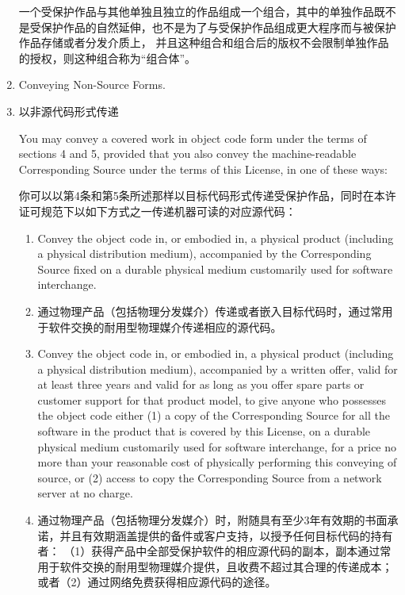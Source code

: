 \documentclass[11pt]{article}
\begin{document}
\begin{enumerate}
         一个受保护作品与其他单独且独立的作品组成一个组合，其中的单独作品既不是受保护作品的自然延伸，也不是为了与受保护作品组成更大程序而与被保护作品存储或者分发介质上，
        并且这种组合和组合后的版权不会限制单独作品的授权，则这种组合称为“组合体”。

  \item Conveying Non-Source Forms.
  \item 以非源代码形式传递

        You may convey a covered work in object code form under the terms
        of sections 4 and 5, provided that you also convey the
        machine-readable Corresponding Source under the terms of this License,
        in one of these ways:

        你可以以第4条和第5条所述那样以目标代码形式传递受保护作品，同时在本许证可规范下以如下方式之一传递机器可读的对应源代码：

        \begin{enumerate}
          \item Convey the object code in, or embodied in, a physical product
                (including a physical distribution medium), accompanied by the
                Corresponding Source fixed on a durable physical medium
                customarily used for software interchange.

          \item 通过物理产品（包括物理分发媒介）传递或者嵌入目标代码时，通过常用于软件交换的耐用型物理媒介传递相应的源代码。

          \item Convey the object code in, or embodied in, a physical product
                (including a physical distribution medium), accompanied by a
                written offer, valid for at least three years and valid for as
                long as you offer spare parts or customer support for that product
                model, to give anyone who possesses the object code either (1) a
                copy of the Corresponding Source for all the software in the
                product that is covered by this License, on a durable physical
                medium customarily used for software interchange, for a price no
                more than your reasonable cost of physically performing this
                conveying of source, or (2) access to copy the
                Corresponding Source from a network server at no charge.

          \item 通过物理产品（包括物理分发媒介）时，附随具有至少3年有效期的书面承诺，并且有效期涵盖提供的备件或客户支持，以授予任何目标代码的持有者：
                （1）获得产品中全部受保护软件的相应源代码的副本，副本通过常用于软件交换的耐用型物理媒介提供，且收费不超过其合理的传递成本；
                或者（2）通过网络免费获得相应源代码的途径。


\end{enumerate}
\end{enumerate}
\end{document}

